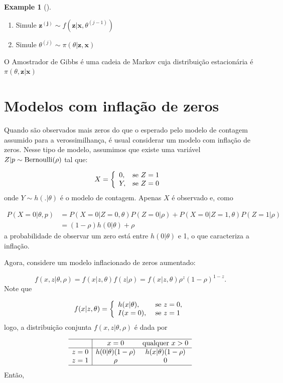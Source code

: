 \documentclass[
  letterpaper,
  DIV=11,
  numbers=noendperiod]{scrreprt}
\theoremstyle{definition}
\theoremstyle{plain}
\theoremstyle{definition}
\newtheorem{example}{Example}[chapter]
\theoremstyle{remark}
\begin{document}
\begin{example}[]
\begin{enumerate}
\def\labelenumi{\arabic{enumi}.}
\item
  Simule
  \(\boldsymbol{z^{(j)}}\sim f(\boldsymbol{z}|\boldsymbol{x},\theta^{(j-1)})\)
\item
  Simule \(\theta^{(j)}\sim \pi(\theta|\boldsymbol{z},\boldsymbol{x})\)
\end{enumerate}

O Amostrador de Gibbs é uma cadeia de Markov cuja distribuição
estacionária é \(\pi(\theta,\boldsymbol{z}|\boldsymbol{x})\)

\section{Modelos com inflação de
zeros}\label{modelos-com-inflauxe7uxe3o-de-zeros}

Quando são observados mais zeros do que o esperado pelo modelo de
contagem assumido para a verossimilhança, é usual considerar um modelo
com inflação de zeros. Nesse tipo de modelo, assumimos que existe uma
variável \(Z|p\sim\hbox{Bernoulli}(\rho)\) tal que:

\[X=\left\{\begin{array}{ll}0, & \hbox{se }Z=1\ \\ Y,&\hbox{se }Z=0\end{array}\right.\]
onde \(Y\sim h(.|\theta)\) é o modelo de contagem. Apenas \(X\) é
observado e, como

\[\begin{align}P(X=0|\theta,p)&=P(X=0|Z=0,\theta)P(Z=0|\rho)+P(X=0|Z=1,\theta)P(Z=1|\rho)\\&=(1-\rho)h(0|\theta)+\rho\end{align}\]
a probabilidade de observar um zero está entre \(h(0|\theta)\) e 1, o
que caracteriza a inflação.

Agora, considere um modelo inflacionado de zeros aumentado:

\[f(x,z|\theta,\rho)=f(x|z,\theta)f(z|\rho)=f(x|z,\theta)\rho^z(1-\rho)^{1-z}.\]
Note que

\[f(x|z,\theta)=\left\{
\begin{array}{ll}
h(x|\theta),&\hbox{ se }z=0,\\
I(x=0),&\hbox{ se }z=1\\
\end{array}\right.\] logo, a distribuição conjunta
\(f(x,z|\theta,\rho)\) é dada por

\[\begin{array}{c|cc}\hline & x=0 & \hbox{qualquer }x> 0 \\ \hline
z=0 & h(0|\theta)(1-\rho) & h(x|\theta)(1-\rho) \\
z=1 & \rho & 0 \\ \hline
\end{array}
\] Então,


\end{example}
\end{document}

